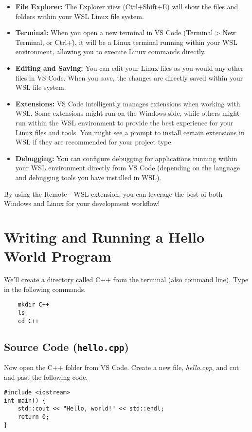 \documentclass{article}
\begin{document}
\begin{itemize}
    \item \textbf{File Explorer:} The Explorer view (Ctrl+Shift+E) will show the files and folders within your WSL Linux file system.
    \item \textbf{Terminal:} When you open a new terminal in VS Code (Terminal \textgreater{} New Terminal, or Ctrl+\`), it will be a Linux terminal running within your WSL environment, allowing you to execute Linux commands directly.
    \item \textbf{Editing and Saving:} You can edit your Linux files as you would any other files in VS Code. When you save, the changes are directly saved within your WSL file system.
    \item \textbf{Extensions:} VS Code intelligently manages extensions when working with WSL. Some extensions might run on the Windows side, while others might run within the WSL environment to provide the best experience for your Linux files and tools. You might see a prompt to install certain extensions in WSL if they are recommended for your project type.
    \item \textbf{Debugging:} You can configure debugging for applications running within your WSL environment directly from VS Code (depending on the language and debugging tools you have installed in WSL).
\end{itemize}


By using the Remote - WSL extension, you can leverage the best of both Windows and Linux for your development workflow!

\section{Writing and Running a Hello World Program}

We'll create a directory called C++ from the terminal (also command line). Type in the following commands. \\
\begin{verbatim}
	mkdir C++ 
	ls
	cd C++
\end{verbatim}


\subsection{Source Code (\texttt{hello.cpp})}
Now open the C++ folder from VS Code. Create a new file, \textit{hello.cpp}, and cut and past the following code. \\
\begin{lstlisting}[style=cppstyle]
#include <iostream>
int main() {
    std::cout << "Hello, world!" << std::endl;
    return 0;
}
\end{lstlisting}
\end{document}
